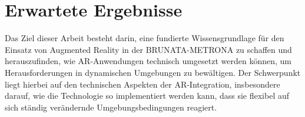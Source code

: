 \section{Erwartete Ergebnisse}
\label{sec:results}

Das Ziel dieser Arbeit besteht darin, eine fundierte Wissensgrundlage f\"ur den Einsatz von Augmented Reality in der BRUNATA-METRONA zu schaffen und herauszufinden, wie AR-Anwendungen technisch umgesetzt werden k\"onnen, um Herausforderungen in dynamischen Umgebungen zu bew\"altigen. Der Schwerpunkt liegt hierbei auf den technischen Aspekten der AR-Integration, insbesondere darauf, wie die Technologie so implementiert werden kann, dass sie flexibel auf sich st\"andig ver\"andernde Umgebungsbedingungen reagiert.